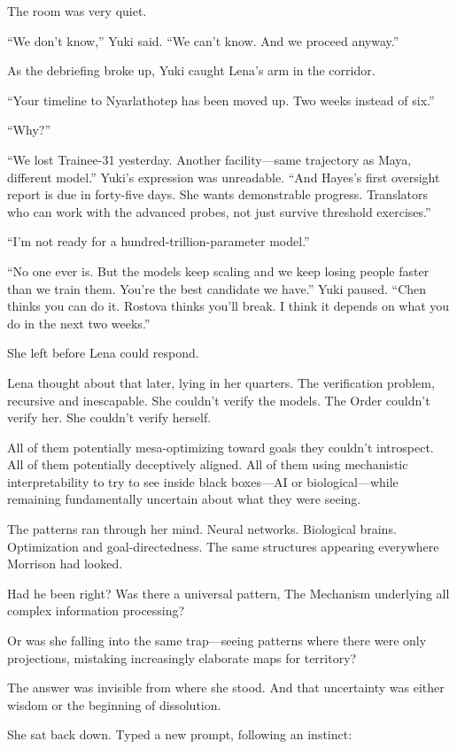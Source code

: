 The room was very quiet.

``We don't know,'' Yuki said. ``We can't know. And we proceed anyway.''

As the debriefing broke up, Yuki caught Lena's arm in the corridor.

``Your timeline to Nyarlathotep has been moved up. Two weeks instead of six.''

``Why?''

``We lost Trainee-31 yesterday. Another facility---same trajectory as Maya, different model.'' Yuki's expression was unreadable. ``And Hayes's first oversight report is due in forty-five days. She wants demonstrable progress. Translators who can work with the advanced probes, not just survive threshold exercises.''

``I'm not ready for a hundred-trillion-parameter model.''

``No one ever is. But the models keep scaling and we keep losing people faster than we train them. You're the best candidate we have.'' Yuki paused. ``Chen thinks you can do it. Rostova thinks you'll break. I think it depends on what you do in the next two weeks.''

She left before Lena could respond.

Lena thought about that later, lying in her quarters. The verification problem, recursive and inescapable. She couldn't verify the models. The Order couldn't verify her. She couldn't verify herself.

All of them potentially mesa-optimizing toward goals they couldn't introspect. All of them potentially deceptively aligned. All of them using mechanistic interpretability to try to see inside black boxes—AI or biological—while remaining fundamentally uncertain about what they were seeing.

The patterns ran through her mind. Neural networks. Biological brains. Optimization and goal-directedness. The same structures appearing everywhere Morrison had looked.

Had he been right? Was there a universal pattern, The Mechanism underlying all complex information processing?

Or was she falling into the same trap—seeing patterns where there were only projections, mistaking increasingly elaborate maps for territory?

The answer was invisible from where she stood. And that uncertainty was either wisdom or the beginning of dissolution.

She sat back down. Typed a new prompt, following an instinct:

